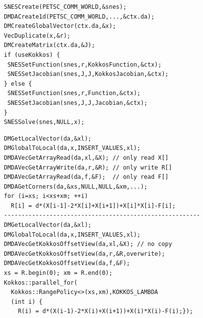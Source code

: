 \documentclass[10pt,journal,compsoc]{IEEEtran}
\begin{document}
\begin{lstlisting}[caption={Main application code for CPU or GPU},label={lst:main},frame=single,captionpos=b]
SNESCreate(PETSC_COMM_WORLD,&snes);
DMDACreate1d(PETSC_COMM_WORLD,...,&ctx.da);
DMCreateGlobalVector(ctx.da,&x); 
VecDuplicate(x,&r); 
DMCreateMatrix(ctx.da,&J); 
if (useKokkos) {
 SNESSetFunction(snes,r,KokkosFunction,&ctx); 
 SNESSetJacobian(snes,J,J,KokkosJacobian,&ctx); 
} else {
 SNESSetFunction(snes,r,Function,&ctx); 
 SNESSetJacobian(snes,J,J,Jacobian,&ctx); 
}
SNESSolve(snes,NULL,x); 
\end{lstlisting}

\begin{lstlisting}[caption={Traditional PETSc Function (top) and Kokkos version (bottom). {\tt xl}, {\tt x}, {\tt r}, {\tt f} are PETSc vectors. {\tt X}, {\tt R}, {\tt F} at the top are {\tt double*} or {\tt const double*} like pointers but at the bottom are Kokkos unmanaged {\tt OffsetView}s.},label={lst:function},frame=single,captionpos=b]
DMGetLocalVector(da,&xl);
DMGlobalToLocal(da,x,INSERT_VALUES,xl);
DMDAVecGetArrayRead(da,xl,&X); // only read X[]
DMDAVecGetArrayWrite(da,r,&R); // only write R[]
DMDAVecGetArrayRead(da,f,&F);  // only read F[]
DMDAGetCorners(da,&xs,NULL,NULL,&xm,...);
for (i=xs; i<xs+xm; ++i)
  R[i] = d*(X[i-1]-2*X[i]+X[i+1])+X[i]*X[i]-F[i];
--------------------------------------------------------
DMGetLocalVector(da,&xl);
DMGlobalToLocal(da,x,INSERT_VALUES,xl);
DMDAVecGetKokkosOffsetView(da,xl,&X); // no copy
DMDAVecGetKokkosOffsetView(da,r,&R,overwrite);
DMDAVecGetKokkosOffsetView(da,f,&F);
xs = R.begin(0); xm = R.end(0);
Kokkos::parallel_for( 
  Kokkos::RangePolicy<>(xs,xm),KOKKOS_LAMBDA 
  (int i) {
    R(i) = d*(X(i-1)-2*X(i)+X(i+1))+X(i)*X(i)-F(i);});
\end{lstlisting}
\end{document}

